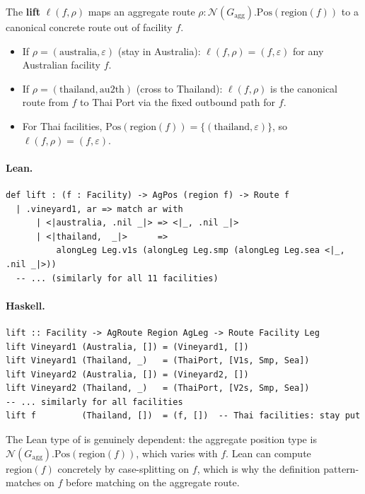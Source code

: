 \documentclass[11pt,a4paper]{article}
\begin{document}
\begin{defn}
The \textbf{lift} $\ell(f, \rho)$ maps an aggregate route $\rho :
\mathcal{N}(G_{\mathrm{agg}}).\mathrm{Pos}(\mathrm{region}(f))$ to a
canonical concrete route out of facility $f$.

\begin{itemize}
  \item If $\rho = (\mathrm{australia}, \varepsilon)$ (stay in Australia):
    $\ell(f, \rho) = (f, \varepsilon)$ for any Australian facility $f$.
  \item If $\rho = (\mathrm{thailand}, \mathrm{au2th})$ (cross to Thailand):
    $\ell(f, \rho)$ is the canonical route from $f$ to Thai Port via the
    fixed outbound path for $f$.
  \item For Thai facilities, $\mathrm{Pos}(\mathrm{region}(f)) =
    \{(\mathrm{thailand}, \varepsilon)\}$, so $\ell(f, \rho) = (f, \varepsilon)$.
\end{itemize}
\end{defn}

\paragraph{Lean.}
\begin{lstlisting}[style=lean]
def lift : (f : Facility) -> AgPos (region f) -> Route f
  | .vineyard1, ar => match ar with
      | <|australia, .nil _|> => <|_, .nil _|>
      | <|thailand,  _|>      =>
          alongLeg Leg.v1s (alongLeg Leg.smp (alongLeg Leg.sea <|_, .nil _|>))
  -- ... (similarly for all 11 facilities)
\end{lstlisting}

\paragraph{Haskell.}
\begin{lstlisting}[style=haskell]
lift :: Facility -> AgRoute Region AgLeg -> Route Facility Leg
lift Vineyard1 (Australia, []) = (Vineyard1, [])
lift Vineyard1 (Thailand, _)   = (ThaiPort, [V1s, Smp, Sea])
lift Vineyard2 (Australia, []) = (Vineyard2, [])
lift Vineyard2 (Thailand, _)   = (ThaiPort, [V2s, Smp, Sea])
-- ... similarly for all facilities
lift f         (Thailand, [])  = (f, [])  -- Thai facilities: stay put
\end{lstlisting}

\begin{fidelitynote}
The Lean type of  is genuinely dependent: the aggregate position
type is $\mathcal{N}(G_{\mathrm{agg}}).\mathrm{Pos}(\mathrm{region}(f))$,
which varies with $f$.  Lean can compute $\mathrm{region}(f)$ concretely by
case-splitting on $f$, which is why the definition pattern-matches on $f$
before matching on the aggregate route.
\end{fidelitynote}
\end{document}
